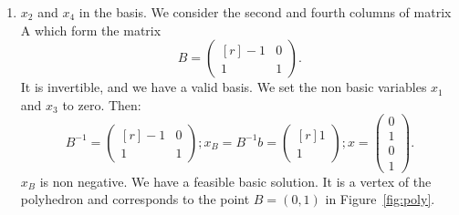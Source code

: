 \begin{enumerate}
\begin{enumerate}
\item $x_2$ and $x_4$ in the basis. We consider the second and fourth columns of matrix A which form the matrix 
$$B = \begin{pmatrix*}[r]
-1&0\\
1&1
\end{pmatrix*}.$$
  It is invertible, and we have a valid basis. 
We set the non basic  variables $x_1$ and $x_3$ to zero. Then: 
$$
B^{-1} =
\begin{pmatrix*}[r]
-1&0\\
1&1
\end{pmatrix*}
;
x_B=B^{-1}b=
\begin{pmatrix*}[r]
1\\
1
\end{pmatrix*}
;
x
=
\begin{pmatrix}
0\\
1\\
0\\
1
\end{pmatrix}.
$$
$x_B$ is non negative. We have a feasible basic solution. It is a
vertex of the polyhedron and corresponds to the point $B=(0,1)$ in Figure~\ref{fig:poly}.

\end{enumerate}

\end{enumerate}
